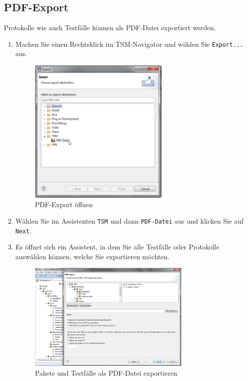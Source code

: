 \documentclass[11pt,a4paper,titlepage]{article}
\begin{document}
\subsection{PDF-Export}
Protokolle wie auch Testfälle können als PDF-Datei exportiert werden.
\begin{enumerate}

\item Machen Sie einen Rechtsklick im TSM-Navigator und wählen Sie \texttt{Export...} aus.

\begin{figure}[H]
\centering
\includegraphics[width= 260px]{BilderHandbuch/PDF/ExportA.png}
\caption{PDF-Export öffnen}
\label{fig:ExportA}
\end{figure}

\item Wählen Sie im Assistenten \texttt{TSM} und dann \texttt{PDF-Datei} aus und klicken Sie auf \texttt{Next}.
\item Es öffnet sich ein Assistent, in dem Sie alle Testfälle oder Protokolle auswählen können, welche Sie exportieren möchten.

\begin{figure}[H]
\centering
\includegraphics[width= 300px]{BilderHandbuch/PDF/ExportB.png}
\caption{Pakete und Testfälle als PDF-Datei exportieren}
\label{fig:ExportB}
\end{figure}


\end{enumerate}
\end{document}
